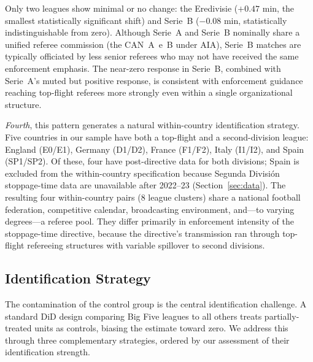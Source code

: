 \documentclass[12pt]{article}
\begin{document}
Only two leagues show minimal or no change: the Eredivisie ($+0.47$ min, the smallest statistically significant shift) and Serie~B ($-0.08$ min, statistically indistinguishable from zero). Although Serie~A and Serie~B nominally share a unified referee commission (the CAN~A~e~B under AIA), Serie~B matches are typically officiated by less senior referees who may not have received the same enforcement emphasis. The near-zero response in Serie~B, combined with Serie~A's muted but positive response, is consistent with enforcement guidance reaching top-flight referees more strongly even within a single organizational structure.

\textit{Fourth}, this pattern generates a natural within-country identification strategy. Five countries in our sample have both a top-flight and a second-division league: England (E0/E1), Germany (D1/D2), France (F1/F2), Italy (I1/I2), and Spain (SP1/SP2). Of these, four have post-directive data for both divisions; Spain is excluded from the within-country specification because Segunda Divisi\'{o}n stoppage-time data are unavailable after 2022--23 (Section~\ref{sec:data}). The resulting four within-country pairs (8 league clusters) share a national football federation, competitive calendar, broadcasting environment, and---to varying degrees---a referee pool. They differ primarily in enforcement intensity of the stoppage-time directive, because the directive's transmission ran through top-flight refereeing structures with variable spillover to second divisions.

\subsection{Identification Strategy}
\label{subsec:identification}

The contamination of the control group is the central identification challenge. A standard DiD design comparing Big Five leagues to all others treats partially-treated units as controls, biasing the estimate toward zero. We address this through three complementary strategies, ordered by our assessment of their identification strength.
\end{document}
